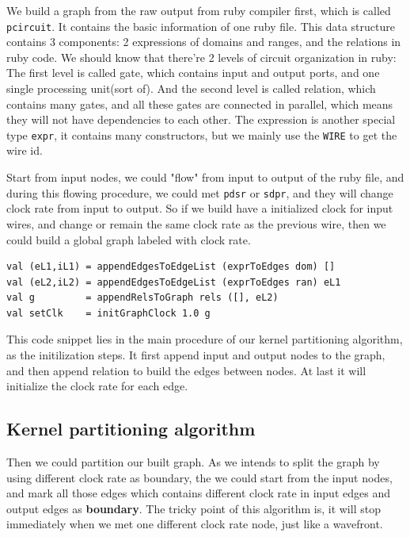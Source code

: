 \documentclass[a4paper, 10pt]{report}
\begin{document}
We build a graph from the raw output from ruby compiler first, which is called \texttt{pcircuit}. It contains the basic information of one ruby file. This data structure contains 3 components: 2 expressions of domains and ranges, and the relations in ruby code. We should know that there're 2 levels of circuit organization in ruby: The first level is called gate, which contains input and output ports, and one single processing unit(sort of). And the second level is called relation, which contains many gates, and all these gates are connected in parallel, which means they will not have dependencies to each other. The expression is another special type \texttt{expr}, it contains many constructors, but we mainly use the \texttt{WIRE} to get the wire id.

Start from input nodes, we could "flow" from input to output of the ruby file, and during this flowing procedure, we could met \texttt{pdsr} or \texttt{sdpr}, and they will change clock rate from input to output. So if we build have a initialized clock for input wires, and change or remain the same clock rate as the previous wire, then we could build a global graph labeled with clock rate.

\begin{lstlisting}[caption=Build labeled graph]
val (eL1,iL1) = appendEdgesToEdgeList (exprToEdges dom) []
val (eL2,iL2) = appendEdgesToEdgeList (exprToEdges ran) eL1
val g         = appendRelsToGraph rels ([], eL2)
val setClk    = initGraphClock 1.0 g
\end{lstlisting}

This code snippet lies in the main procedure of our kernel partitioning algorithm, as the initilization steps. It first append input and output nodes to the graph, and then append relation to build the edges between nodes. At last it will initialize the clock rate for each edge.

\subsection{Kernel partitioning algorithm}

Then we could partition our built graph. As we intends to split the graph by using different clock rate as boundary, the we could start from the input nodes, and mark all those edges which contains different clock rate in input edges and output edges as \textbf{boundary}. The tricky point of this algorithm is, it will stop immediately when we met one different clock rate node, just like a wavefront.
\end{document}
